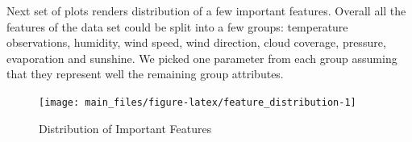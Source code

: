 \begin{table}[ht]
\centering
{}
\caption{\tt Weather Obesrvations Data Sample} 
\label{data_head}
\end{table}

Next set of plots renders distribution of a few important features.
Overall all the features of the data set could be split into a few
groups: temperature observations, humidity, wind speed, wind direction,
cloud coverage, pressure, evaporation and sunshine. We picked one
parameter from each group assuming that they represent well the
remaining group attributes.

\begin{Schunk}
\begin{figure}[H]

{\centering \texttt{[image: main\_files/figure-latex/feature\_distribution-1]} 

}

\caption[ Distribution of Important Features]{ Distribution of Important Features}\label{fig:feature_distribution}
\end{figure}
\end{Schunk}

